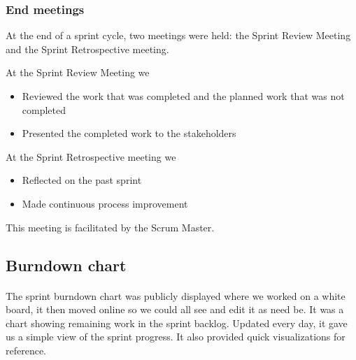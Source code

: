 \documentclass{article}
\begin{document}
\subsubsection{End meetings}
At the end of a sprint cycle, two meetings were held: the Sprint Review Meeting and the Sprint Retrospective meeting.

At the Sprint Review Meeting we
\begin{itemize}
\item Reviewed the work that was completed and the planned work that was not completed
\item Presented the completed work to the stakeholders
\end{itemize}
At the Sprint Retrospective meeting we
\begin{itemize}
\item Reflected on the past sprint
\item Made continuous process improvement
\end{itemize}
This meeting is facilitated by the Scrum Master.

\subsection{Burndown chart}
\paragraph{}The sprint burndown chart was publicly displayed where we worked on a white board, it then moved online so we could all see and edit it as need be. It was a chart showing remaining work in the sprint backlog. Updated every day, it gave us a simple view of the sprint progress. It also provided quick visualizations for reference.

\newpage
\end{document}
